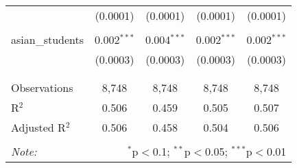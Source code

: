 \begin{table}[!htbp]
\begin{tabular}{@{\extracolsep{-2pt}}lcccc}
  & (0.0001) & (0.0001) & (0.0001) & (0.0001) \\ 
  & & & & \\ 
 asian\_students & 0.002$^{***}$ & 0.004$^{***}$ & 0.002$^{***}$ & 0.002$^{***}$ \\ 
  & (0.0003) & (0.0003) & (0.0003) & (0.0003) \\ 
  & & & & \\ 
\hline \\[-1.8ex] 
Observations & 8,748 & 8,748 & 8,748 & 8,748 \\ 
R$^{2}$ & 0.506 & 0.459 & 0.505 & 0.507 \\ 
Adjusted R$^{2}$ & 0.506 & 0.458 & 0.504 & 0.506 \\ 
\hline 
\hline \\[-1.8ex] 
\textit{Note:}  & \multicolumn{4}{r}{$^{*}$p$<$0.1; $^{**}$p$<$0.05; $^{***}$p$<$0.01} \\ 
\end{tabular} 
\end{table} 
